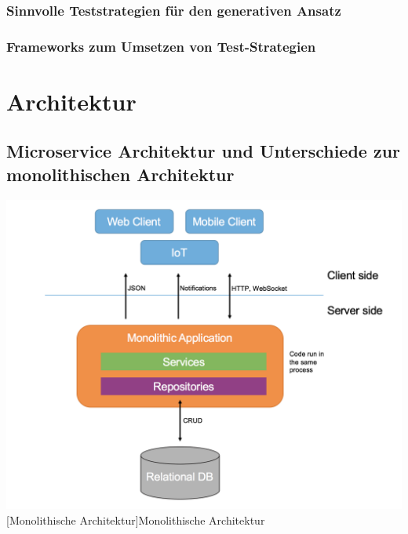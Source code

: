 \documentclass[12pt,a4paper,bibliography=totocnumbered,listof=totocnumbered]{scrartcl}
\begin{document}
\subsubsection{Sinnvolle Teststrategien für den generativen Ansatz}

\subsubsection{Frameworks zum Umsetzen von Test-Strategien}

\section{Architektur}

\subsection{Microservice Architektur und Unterschiede zur monolithischen Architektur}

\vspace{1em}
\begin{minipage}{\linewidth}
	\centering
	\includegraphics[width=0.9\linewidth]{images/img_monolithic-arch.PNG}
	[Monolithische Architektur]{Monolithische Architektur \cite{dinh}}
	\label{fig:img_monolithic-arch}
\end{minipage}
\end{document}
